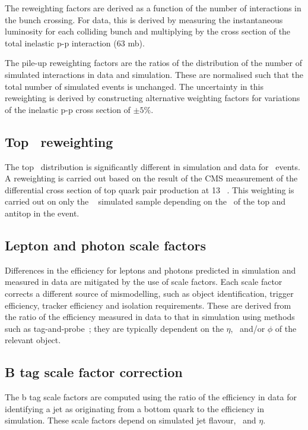 The reweighting factors are derived as a function of the number 
of interactions in the bunch crossing. For data, this is derived by measuring the instantaneous luminosity
for each colliding bunch and multiplying by the cross section 
of the total inelastic p-p interaction (63 mb). 

The pile-up reweighting factors are the ratios of the distribution of the number
of simulated interactions in data and simulation. These are normalised such that the 
total number of simulated events is unchanged. The uncertainty in this reweighting is derived by 
constructing alternative weighting factors for variations 
of the inelastic p-p cross section of $\pm5\%$.

\subsection{Top \pt~reweighting}

The top \pt~distribution is significantly different in simulation and data for 
\ttbar~events. A reweighting is carried out based on the result of the CMS 
measurement of the differential cross section of top quark pair production 
at 13 \TeV~\cite{toppt}. This weighting is carried out on only the \ttbar~ 
simulated sample depending on the \pt~of the top and antitop in the event.

\subsection{Lepton and photon scale factors}
\label{sec:scale-factor}
Differences in the efficiency for leptons and photons predicted in 
simulation and measured in data are mitigated by the use of scale factors. 
Each scale factor corrects a different source of mismodelling, such as 
object identification, trigger efficiency, tracker efficiency and isolation requirements.
These are derived from the ratio of the efficiency measured in data to that
in simulation using methods such as tag-and-probe~\cite{MuonReco};
they are typically dependent on the $\eta$, \pt~and/or $\phi$ of the relevant object.

\subsection{B tag scale factor correction}

The b tag scale factors are computed using the ratio of the efficiency in data
for identifying a jet as originating from a bottom quark 
to the efficiency in simulation. These scale factors depend on simulated jet flavour, \pt~and $\eta$. 

